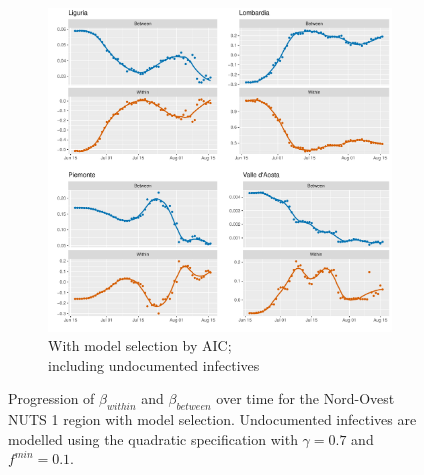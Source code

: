 \documentclass[12pt]{article}
\begin{document}
\begin{appendices}
\begin{figure}[H]
\begin{subfigure}{\textwidth}
    	      \includegraphics[width=\linewidth]{output/model_between_lag14_betas_Nord-Ovest_aic_UndocQuadratic_rolling.pdf}
    	      \caption{With model selection by AIC; \\ including undocumented infectives}
    	      \label{fig:beta_between_over_time_nordovest_aic_undoc}
    	    \end{subfigure}
    	    \caption{Progression of $\beta_{within}$ and $\beta_{between}$ over time for the Nord-Ovest NUTS 1 region with model selection. Undocumented infectives are modelled using the quadratic specification with $\gamma = 0.7$ and $f^{min}=0.1$.}
    	    \label{fig:beta_between_over_time_nordovest_only_aic}
        \end{figure}
		

\end{appendices}
\end{document}
